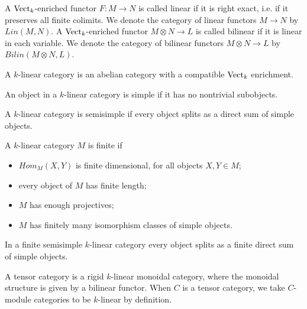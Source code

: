 \begin{definition}

A $\operatorname{Vect}_k$-enriched functor $F:M\to N$ is called linear if it is right exact, i.e. if it preserves all finite colimits. We denote the category of linear functors $M\to N$ by $Lin(M,N)$. A $\operatorname{Vect}_k$-enriched functor $M\otimes N \to L$ is called bilinear if it is linear in each variable. We denote the category of bilinear functors $M\otimes N \to L$ by $Bilin(M\otimes N, L)$.\end{definition}

\begin{definition}
A $k$-linear category is an abelian category with a compatible $\operatorname{Vect}_k$ enrichment. \end{definition}

\begin{definition}

An object in a $k$-linear category is simple if it has no nontrivial subobjects.\end{definition}


\begin{definition}
A $k$-linear category is semisimple if every object splits as a direct sum of simple objects.
\end{definition}


\begin{definition}

A $k$-linear category $M$ is finite if \begin{itemize}
\item $Hom_M(X,Y)$ is finite dimensional, for all objects $X,Y\in M$;
\item every object of $M$ has finite length;
\item $M$ has enough projectives;
\item $M$ has finitely many isomorphism classes of simple objects.
\end{itemize}\end{definition}

\begin{remark}
 In a finite semisimple $k$-linear category every object splits as a finite direct sum of simple objects.\end{remark}



\begin{definition}

A tensor category is a rigid $k$-linear monoidal category, where the monoidal structure is given by a bilinear functor. When $C$ is a tensor category, we take $C$-module categories to be $k$-linear by definition.\end{definition}


